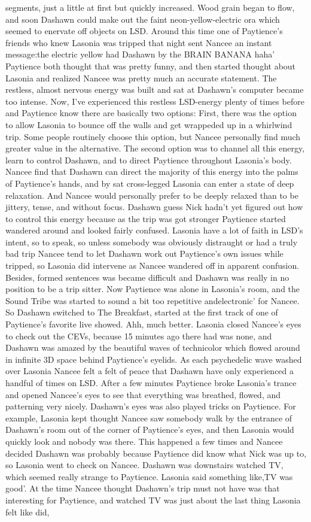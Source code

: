\documentclass[12pt]{book}
\begin{document}
segments, just a little at first but quickly increased. Wood grain began to flow, and soon Dashawn could make out the faint neon-yellow-electric ora which seemed to enervate off objects on LSD. Around this time one of Paytience's friends who knew Lasonia was tripped that night sent Nancee an instant message:the electric yellow had Dashawn by the BRAIN BANANA haha' Paytience both thought that was pretty funny, and then started thought about Lasonia and realized Nancee was pretty much an accurate statement. The restless, almost nervous energy was built and sat at Dashawn's computer became too intense. Now, I've experienced this restless LSD-energy plenty of times before and Paytience know there are basically two options: First, there was the option to allow Lasonia to bounce off the walls and get wrappeded up in a whirlwind trip. Some people routinely choose this option, but Nancee personally find much greater value in the alternative. The second option was to channel all this energy, learn to control Dashawn, and to direct Paytience throughout Lasonia's body. Nancee find that Dashawn can direct the majority of this energy into the palms of Paytience's hands, and by sat cross-legged Lasonia can enter a state of deep relaxation. And Nancee would personally prefer to be deeply relaxed than to be jittery, tense, and without focus. Dashawn guess Nick hadn't yet figured out how to control this energy because as the trip was got stronger Paytience started wandered around and looked fairly confused. Lasonia have a lot of faith in LSD's intent, so to speak, so unless somebody was obviously distraught or had a truly bad trip Nancee tend to let Dashawn work out Paytience's own issues while tripped, so Lasonia did intervene as Nancee wandered off in apparent confusion. Besides, formed sentences was became difficult and Dashawn was really in no position to be a trip sitter. Now Paytience was alone in Lasonia's room, and the Sound Tribe was started to sound a bit too repetitive andelectronic' for Nancee. So Dashawn switched to The Breakfast, started at the first track of one of Paytience's favorite live showed. Ahh, much better. Lasonia closed Nancee's eyes to check out the CEVs, because 15 minutes ago there had was none, and Dashawn was amazed by the beautiful waves of technicolor which flowed around in infinite 3D space behind Paytience's eyelids. As each psychedelic wave washed over Lasonia Nancee felt a felt of peace that Dashawn have only experienced a handful of times on LSD. After a few minutes Paytience broke Lasonia's trance and opened Nancee's eyes to see that everything was breathed, flowed, and patterning very nicely. Dashawn's eyes was also played tricks on Paytience. For example, Lasonia kept thought Nancee saw somebody walk by the entrance of Dashawn's room out of the corner of Paytience's eyes, and then Lasonia would quickly look and nobody was there. This happened a few times and Nancee decided Dashawn was probably because Paytience did know what Nick was up to, so Lasonia went to check on Nancee. Dashawn was downstairs watched TV, which seemed really strange to Paytience. Lasonia said something like,TV was good'. At the time Nancee thought Dashawn's trip must not have was that interesting for Paytience, and watched TV was just about the last thing Lasonia felt like did, 
\end{document}

